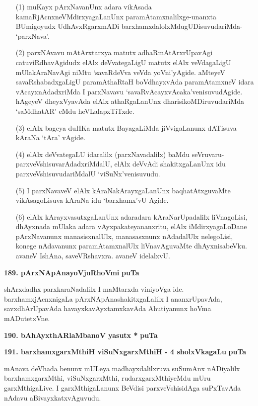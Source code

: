 \begin{itemize}
\item[(1)] muKayx pArxNavanUnx adara vikAsada kamaRjAcnxneVMdirxyagaLanUnx paramAtamxnalilxge-unanxta BUmigoyudx UdhAvxRgarxmADi barxhamxdalolxMdugUDisuvudariMda- `parxNava'.
\item[(2)] parxNAvavu mAtArxtarxya matutx adhaRmAtArxrUpavAgi catuviRdhavAgidudx elAlx deVvategaLigU matutx elAlx veVdagaLigU mUlakAraNavAgi niMtu `savaRdeVva veVda yoVni'yAgide. aMteyeV savaRshabadxgaLigU paramAthaRtaH boVdhayxvAda paramAtamxneV idara vAcayxnAdadxriMda I parxNavavu `savaRvAcayxvAcaka'venisuvudAgide. hAgeyeV dheyxVyavAda elAlx athaRgaLanUnx dharisikoMDiruvudariMda `saMdhatAR' eMdu heVLalapxTiTxde.
\item[(3)] elAlx bageya duHKa matutx BayagaLiMda jiVvigaLanunx dATisuva kAraNa `tAra' vAgide.
\item[(4)] elAlx deVvategaLU idaralilx (parxNavadalilx) baMdu seVruvaru-parxveVshisuvarAdadxriMdalU, elAlx deVvAdi shakitxgaLanUnx idu parxveVshisuvudariMdalU `viSuNx'venisuvudu.
\item[(5)] I parxNavaveV elAlx kAraNakArayxgaLanUnx baqhatAtxguvaMte vikAsagoLisuva kAraNa idu `barxhamx'vU Agide.
\item[(6)] elAlx kArayxvasutxgaLanUnx adaradara kAraNarUpadalilx liVnagoLisi, dhAyxnada mUlaka adara vAyxpakateyananxritu, elAlx iMdirxyagaLoDane pArxNavanunx manasisxnalUlx, manasasxnunx nAdadalUlx nelegoLisi, konege nAdavanunx paramAtamxnalUlx liVnavAguvaMte dhAyxnisabeVku. avaneV IshAna, saveVRshavxra. avaneV idelalxvU.
\end{itemize}

\medskip
\noindent
\textbf{189. pArxNApAnayoVjuRhoVmi} \hfill{\bf puTa \pageref{186a}}

\smallskip
shArxdadhx parxkaraNadalilx I maMtarxda viniyoVga ide. barxhamxjAcnxnigaLa pArxNApAnashakitxgaLalilx I ananxrUpavAda, savxdhArUpavAda havayxkavAyxtamxkavAda Ahutiyanunx hoVma mADutetxVne.

\medskip
\noindent
\textbf{190. bAhAyxthARlaMbanoV yasutx *} \hfill{\bf puTa \pageref{225}}

\medskip
\noindent
\textbf{191. barxhamxgarxMthiH viSuNxgarxMthiH - 4 sholxVkagaLu} \hfill{\bf puTa \pageref{150c}}

\smallskip
mAnava deVhada benunx mULeya madhayxdalilxruva suSumAnx nADiyalilx barxhamxgarxMthi, viSuNxgarxMthi, rudarxgarxMthiyeMdu mUru garxMthigaLive. I garxMthigaLanunx BeVdisi parxveVshisidAga suPxTavAda nAdavu aBivayxkatxvAguvudu.

